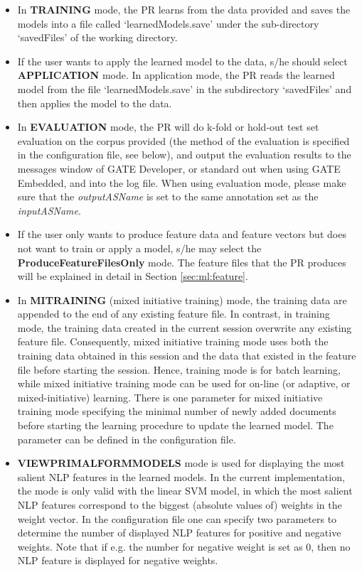 \begin{itemize}
\begin{itemize}

\item In {\bf TRAINING} mode, the PR learns from the data provided and saves the
models into a file called `learnedModels.save' under the sub-directory
`savedFiles' of the working directory.

\item If the user wants to apply the learned model to the data, s/he should
select {\bf APPLICATION} mode.
 In application mode, the PR reads the learned model from the file
 `learnedModels.save' in the subdirectory `savedFiles' and then applies the
 model to the data.

\item In {\bf EVALUATION} mode, the PR will do k-fold or hold-out test set
evaluation on the corpus provided (the method of the evaluation is specified in
the configuration file, see below), and output the evaluation results to the
messages window of GATE Developer, or standard out when using GATE Embedded, and
into the log file. When using evaluation mode, please make sure that the {\em
outputASName} is set to the same annotation set as the {\em inputASName}.

\item If the user only wants to produce feature data and feature vectors but does
not want to train or apply a model, s/he may select the {\bf
ProduceFeatureFilesOnly} mode. The feature files that the PR produces will be
explained in detail in Section \ref{sec:ml:feature}.

\item In {\bf MITRAINING} (mixed initiative training) mode, the training data are
appended to the end of any existing feature file. In contrast, in training mode,
the training data created in the current session overwrite any existing feature
file. Consequently, mixed initiative training mode uses both the training data
obtained in this session and the data that existed in the feature file before
starting the session. Hence, training mode is for batch learning, while mixed
initiative training mode can be used for on-line (or adaptive, or
mixed-initiative) learning. There is one parameter for mixed initiative training
mode specifying the minimal number of newly added documents before starting the
learning procedure to update the learned model. The parameter can be defined in
the configuration file.

\item {\bf VIEWPRIMALFORMMODELS} mode is used for displaying the most salient
NLP features in the learned models. In the current implementation, the mode is only
valid with the linear SVM model, in which the most salient NLP features
correspond to the biggest (absolute values of) weights in the weight vector. In
the configuration file one can specify two parameters to determine the number of
displayed NLP features for positive and negative weights. Note that if e.g. the
number for negative weight is set as $0$, then no NLP feature is displayed for
negative weights.


\end{itemize}
\end{itemize}
